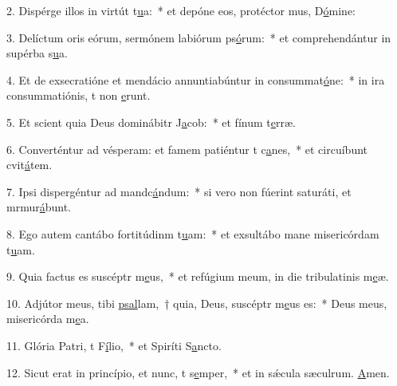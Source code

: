 2. Dispérge illos in virtút t\uline{u}a:~* et depóne eos, protéctor mus, D\uline{ó}mine:\par 
3. Delíctum oris eórum, sermónem labiórum ps\uline{ó}rum:~* et comprehendántur in supérba s\uline{u}a.\par 
4. Et de exsecratióne et mendácio annuntiabúntur in consummat\uline{ó}ne:~* in ira consummatiónis, t non \uline{e}runt.\par 
5. Et scient quia Deus dominábitr J\uline{a}cob:~* et fínum t\uline{e}rræ.\par 
6. Converténtur ad vésperam: et famem patiéntur t c\uline{a}nes,~* et circuíbunt cvit\uline{á}tem.\par 
7. Ipsi dispergéntur ad mandc\uline{á}ndum:~* si vero non fúerint saturáti, et mrmur\uline{á}bunt.\par 
8. Ego autem cantábo fortitúdinm t\uline{u}am:~* et exsultábo mane misericórdam t\uline{u}am.\par 
9. Quia factus es suscéptr m\uline{e}us,~* et refúgium meum, in die tribulatinis m\uline{e}æ.\par 
10. Adjútor meus, tibi \uline{psal}lam,~† quia, Deus, suscéptr m\uline{e}us es:~* Deus meus, misericórda m\uline{e}a.\par 
11. Glória Patri, t F\uline{í}lio,~* et Spiríti S\uline{a}ncto.\par 
12. Sicut erat in princípio, et nunc, t s\uline{e}mper,~* et in sǽcula sæculrum. \uline{A}men.\par 
